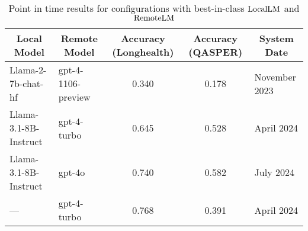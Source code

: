 \begin{table*}[]
\centering
\scriptsize

\begin{tabular}{l l c c l}
\toprule
\multicolumn{1}{c}{\textbf{Local Model}} & \multicolumn{1}{c}{\textbf{Remote Model}} & \textbf{Accuracy (Longhealth)} & \textbf{Accuracy (QASPER)} & \multicolumn{1}{c}{\textbf{System Date}} \\ 
\midrule
Llama-2-7b-chat-hf & gpt-4-1106-preview & 0.340 & 0.178 & November 2023 \\ 
Llama-3.1-8B-Instruct & gpt-4-turbo & 0.645 & 0.528 & April 2024 \\ 
Llama-3.1-8B-Instruct & gpt-4o & 0.740 & 0.582 & July 2024 \\ 
--- & gpt-4-turbo & 0.768 & 0.391 & April 2024 \\ 
\bottomrule
\end{tabular}
\caption{Point in time results for \system configurations with best-in-class $\mathrm{LocalLM}$ and $\mathrm{RemoteLM}$}
\label{tab:system-snapshot}
\end{table*}